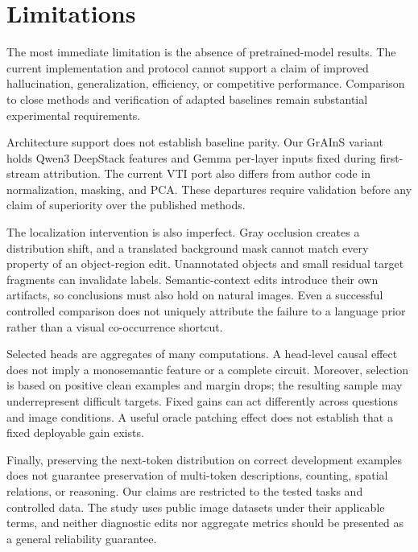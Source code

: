 \section{Limitations}
\label{sec:limitations}

The most immediate limitation is the absence of pretrained-model results.
The current implementation and protocol cannot support a claim of improved
hallucination, generalization, efficiency, or competitive performance.
Comparison to close methods and verification of adapted baselines remain
substantial experimental requirements.

Architecture support does not establish baseline parity. Our GrAInS variant
holds Qwen3 DeepStack features and Gemma per-layer inputs fixed during
first-stream attribution. The current VTI port also differs from author code
in normalization, masking, and PCA. These departures require validation before
any claim of superiority over the published methods.

The localization intervention is also imperfect. Gray occlusion creates a
distribution shift, and a translated background mask cannot match every
property of an object-region edit. Unannotated objects and small residual
target fragments can invalidate labels. Semantic-context edits introduce
their own artifacts, so conclusions must also hold on natural images.
Even a successful controlled comparison does not uniquely attribute the
failure to a language prior rather than a visual co-occurrence shortcut.

Selected heads are aggregates of many computations. A head-level causal
effect does not imply a monosemantic feature or a complete circuit.
Moreover, selection is based on positive clean examples and margin drops;
the resulting sample may underrepresent difficult targets. Fixed gains
can act differently across questions and image conditions. A useful oracle
patching effect does not establish that a fixed deployable gain exists.

Finally, preserving the next-token distribution on correct development
examples does not guarantee preservation of multi-token descriptions,
counting, spatial relations, or reasoning. Our claims are restricted to the
tested tasks and controlled data. The study uses public image datasets
under their applicable terms, and neither diagnostic edits nor aggregate
metrics should be presented as a general reliability guarantee.
